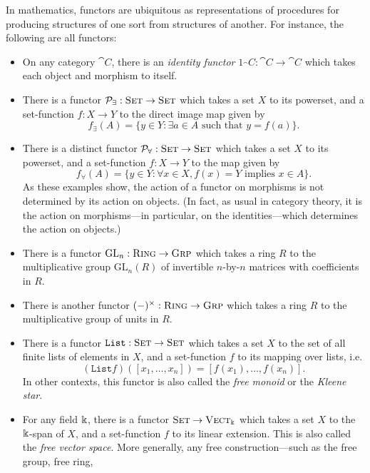 \begin{ex}\label{ex:functors}
  In mathematics, functors are ubiquitous as representations of procedures for
  producing structures of one sort from structures of another. For instance, the
  following are all functors:
  \begin{itemize}
    \item On any category $\cat{C}$, there is an \emph{identity functor}
      $1_\cat{C}: \cat{C}\to\cat{C}$ which takes each object and morphism to
      itself.
    \item There is a functor $\mathcal{P}_\exists: {\textsc{\text{Set}}}\to{\textsc{\text{Set}}}$ which takes
      a set $X$ to its powerset, and a set-function $f: X\to Y$ to the direct
      image map given by \[
        f_\exists(A) = \{y\in Y: \exists a\in A \text{ such that } y = f(a)\}.
      \]
    \item There is a distinct functor $\mathcal{P}_\forall: {\textsc{\text{Set}}}\to{\textsc{\text{Set}}}$
      which takes a set $X$ to its powerset, and a set-function $f: X\to Y$ to
      the map given by \[
        f_\forall(A) = \{y\in Y: \forall x\in X, f(x) = Y \text{ implies } x\in A\}.
      \] As these examples show, the action of a functor on morphisms is not
      determined by its action on objects. (In fact, as usual in category
      theory, it is the action on morphisms---in particular, on the
      identities---which determines the action on objects.)
    \item There is a functor $\text{GL}_n: {\textsc{\text{Ring}}}\to{\textsc{\text{Grp}}}$ which takes a
      ring $R$ to the multiplicative group $\text{GL}_n(R)$ of invertible $n$-by-$n$
      matrices with coefficients in $R$.
    \item There is another functor $(-)^\times: {\textsc{\text{Ring}}}\to{\textsc{\text{Grp}}}$ which takes a
      ring $R$ to the multiplicative group of units in $R$.
    \item There is a functor $\texttt{List}: {\textsc{\text{Set}}}\to{\textsc{\text{Set}}}$ which
      takes a set $X$ to the set of all finite lists of elements in $X$, and a
      set-function $f$ to its mapping over lists, i.e. \[
        (\texttt{List}f)([x_1, \ldots, x_n]) = [f(x_1), \ldots, f(x_n)].
      \]  In other contexts, this functor is also called the \emph{free
      monoid} or the \emph{Kleene star}.
    \item For any field $\Bbbk$, there is a functor ${\textsc{\text{Set}}}\to{\textsc{\text{Vect}}}_\Bbbk$ which
      takes a set $X$ to the $\Bbbk$-span of $X$, and a set-function $f$ to
      its linear extension. This is also called the \emph{free vector space}.
      More generally, any free construction---such as the free group, free ring,

\end{itemize}
\end{ex}
